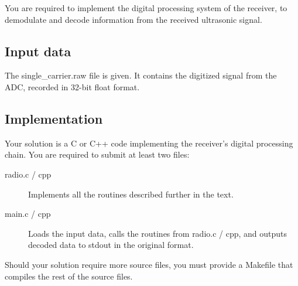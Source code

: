 \documentclass[a4paper]{article}
\begin{document}
You are required to implement the digital processing system of the receiver, to demodulate and decode information from the received ultrasonic signal.

\subsection*{Input data}
The \textsf{single\_carrier.raw} file is given. It contains the digitized signal from the ADC, recorded in 32-bit float format.

\subsection*{Implementation}
Your solution is a C or C++ code implementing the receiver's digital processing chain. You are required to submit at least two files:
\begin{description}
	\item[radio.c / cpp] Implements all the routines described further in the text.
	\item[main.c / cpp] Loads the input data, calls the routines from \textsf{radio.c / cpp}, and outputs decoded data to stdout in the original format.
\end{description}
Should your solution require more source files, you must provide a Makefile that compiles the rest of the source files.
\end{document}
